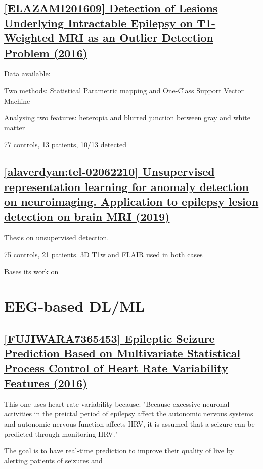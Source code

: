 \newpage
\subsection{\href{https://journals.plos.org/plosone/article?id=10.1371/journal.pone.0161498}{[ELAZAMI201609] Detection of Lesions Underlying Intractable Epilepsy on T1-Weighted MRI as an Outlier Detection Problem (2016)}}
\label{ul3}

Data available: 

Two methods: Statistical Parametric mapping and One-Class Support Vector Machine

Analysing two features: heteropia and blurred junction between gray and white matter

77 controls, 13 patients, 10/13 detected

\newpage
\subsection{\href{https://hal.science/tel-02062210v2/file/these.pdf}{[alaverdyan:tel-02062210] Unsupervised representation learning for anomaly detection on neuroimaging. Application to epilepsy lesion detection on brain MRI (2019)}}
\label{ul4}

Thesis on unsupervised detection. 

75 controls, 21 patients. 3D T1w and FLAIR used in both cases

Bases its work on 

\newpage
\section{EEG-based DL/ML}

\subsection{\href{https://ieeexplore.ieee.org/abstract/document/7365453}{[FUJIWARA7365453] Epileptic Seizure Prediction Based on Multivariate Statistical Process Control of Heart Rate Variability Features (2016) }}

This one uses heart rate variability because: "Because excessive neuronal activities in the preictal period of epilepsy affect the autonomic nervous systems and autonomic nervous function affects HRV, it is assumed that a seizure can be predicted through monitoring HRV."

The goal is to have real-time prediction to improve their quality of live by alerting patients of seizures and 

